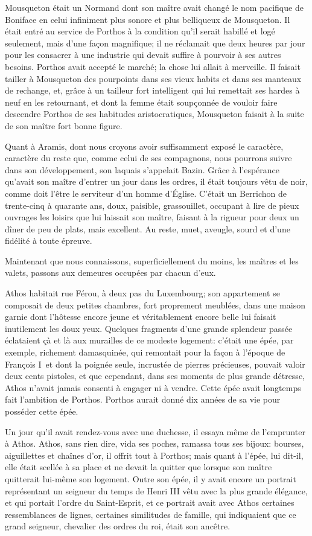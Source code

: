 Mousqueton était un Normand dont son maître avait changé le nom pacifique de Boniface en celui infiniment plus sonore et plus belliqueux de Mousqueton. Il était entré au service de Porthos à la condition qu'il serait habillé et logé seulement, mais d'une façon magnifique; il ne réclamait que deux heures par jour pour les consacrer à une industrie qui devait suffire à pourvoir à ses autres besoins. Porthos avait accepté le marché; la chose lui allait à merveille. Il faisait tailler à Mousqueton des pourpoints dans ses vieux habits et dans ses manteaux de rechange, et, grâce à un tailleur fort intelligent qui lui remettait ses hardes à neuf en les retournant, et dont la femme était soupçonnée de vouloir faire descendre Porthos de ses habitudes aristocratiques, Mousqueton faisait à la suite de son maître fort bonne figure. 

Quant à Aramis, dont nous croyons avoir suffisamment exposé le caractère, caractère du reste que, comme celui de ses compagnons, nous pourrons suivre dans son développement, son laquais s'appelait Bazin. Grâce à l'espérance qu'avait son maître d'entrer un jour dans les ordres, il était toujours vêtu de noir, comme doit l'être le serviteur d'un homme d'Église. C'était un Berrichon de trente-cinq à quarante ans, doux, paisible, grassouillet, occupant à lire de pieux ouvrages les loisirs que lui laissait son maître, faisant à la rigueur pour deux un dîner de peu de plats, mais excellent. Au reste, muet, aveugle, sourd et d'une fidélité à toute épreuve. 

Maintenant que nous connaissons, superficiellement du moins, les maîtres et les valets, passons aux demeures occupées par chacun d'eux. 

Athos habitait rue Férou, à deux pas du Luxembourg; son appartement se composait de deux petites chambres, fort proprement meublées, dans une maison garnie dont l'hôtesse encore jeune et véritablement encore belle lui faisait inutilement les doux yeux. Quelques fragments d'une grande splendeur passée éclataient çà et là aux murailles de ce modeste logement: c'était une épée, par exemple, richement damasquinée, qui remontait pour la façon à l'époque de François I\ier\, et dont la poignée seule, incrustée de pierres précieuses, pouvait valoir deux cents pistoles, et que cependant, dans ses moments de plus grande détresse, Athos n'avait jamais consenti à engager ni à vendre. Cette épée avait longtemps fait l'ambition de Porthos. Porthos aurait donné dix années de sa vie pour posséder cette épée. 

Un jour qu'il avait rendez-vous avec une duchesse, il essaya même de l'emprunter à Athos. Athos, sans rien dire, vida ses poches, ramassa tous ses bijoux: bourses, aiguillettes et chaînes d'or, il offrit tout à Porthos; mais quant à l'épée, lui dit-il, elle était scellée à sa place et ne devait la quitter que lorsque son maître quitterait lui-même son logement. Outre son épée, il y avait encore un portrait représentant un seigneur du temps de Henri III vêtu avec la plus grande élégance, et qui portait l'ordre du Saint-Esprit, et ce portrait avait avec Athos certaines ressemblances de lignes, certaines similitudes de famille, qui indiquaient que ce grand seigneur, chevalier des ordres du roi, était son ancêtre. 

